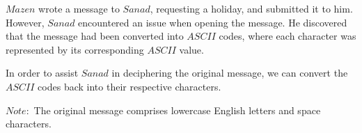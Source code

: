 $Mazen$ wrote a message to $Sanad$, requesting a holiday, and submitted it to him. However, $Sanad$ encountered an issue when opening the message. He discovered that the message had been converted into $ASCII$ codes, where each character was represented by its corresponding $ASCII$ value.

In order to assist $Sanad$ in deciphering the original message, we can convert the $ASCII$ codes back into their respective characters. 

$Note:$ The original message comprises lowercase English letters and space characters.